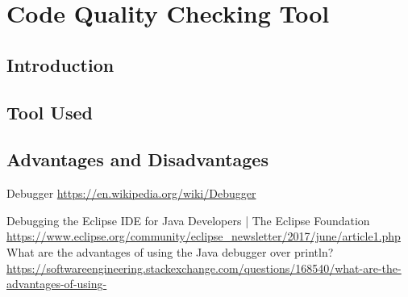 \documentclass[a4paper, 11pt]{article}
\begin{document}
\newpage
\section{Code Quality Checking Tool }
\subsection{Introduction}
\subsection{Tool Used}
\subsection{Advantages and Disadvantages}
\begin{thebibliography}{}
Debugger
\url{https://en.wikipedia.org/wiki/Debugger}

Debugging the Eclipse IDE for Java Developers | The Eclipse Foundation
\url{https://www.eclipse.org/community/eclipse_newsletter/2017/june/article1.php}
What are the advantages of using the Java debugger over println?
\url{https://softwareengineering.stackexchange.com/questions/168540/what-are-the-advantages-of-using-}

\end{thebibliography}
\end{document}
